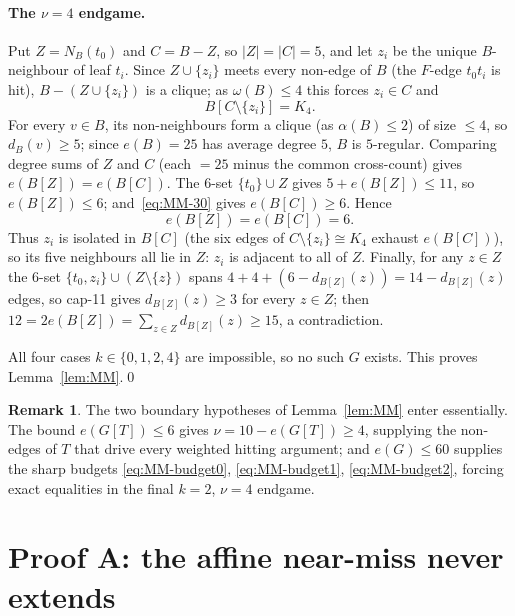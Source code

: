 \documentclass[11pt,reqno]{amsart}
\theoremstyle{definition}
\newtheorem{remark}[theorem]{Remark}
\theoremstyle{remark}
\newcommand{\abs}[1]{\left|#1\right|}
\newcommand{\capeleven}{\textsf{cap-11}}
\begin{document}
\paragraph{The $\nu=4$ endgame.}
Put $Z=N_B(t_0)$ and $C=B-Z$, so $\abs Z=\abs C=5$, and let $z_i$ be the unique
$B$-neighbour of leaf $t_i$. Since $Z\cup\{z_i\}$ meets every non-edge of $B$ (the
$F$-edge $t_0t_i$ is hit), $B-(Z\cup\{z_i\})$ is a clique; as $\omega(B)\le 4$ this
forces $z_i\in C$ and
\begin{equation}\label{eq:MM-30}
  B[C\setminus\{z_i\}]=K_4 .
\end{equation}
For every $v\in B$, its non-neighbours form a clique (as $\alpha(B)\le 2$) of size
$\le 4$, so $d_B(v)\ge 5$; since $e(B)=25$ has average degree $5$, $B$ is
$5$-regular. Comparing degree sums of $Z$ and $C$ (each $=25$ minus the common
cross-count) gives $e(B[Z])=e(B[C])$. The $6$-set $\{t_0\}\cup Z$ gives
$5+e(B[Z])\le 11$, so $e(B[Z])\le 6$; and~\eqref{eq:MM-30} gives $e(B[C])\ge 6$.
Hence
\[
  e(B[Z])=e(B[C])=6 .
\]
Thus $z_i$ is isolated in $B[C]$ (the six edges of $C\setminus\{z_i\}\cong K_4$
exhaust $e(B[C])$), so its five neighbours all lie in $Z$: $z_i$ is adjacent to all
of $Z$. Finally, for any $z\in Z$ the $6$-set $\{t_0,z_i\}\cup(Z\setminus\{z\})$
spans $4+4+(6-d_{B[Z]}(z))=14-d_{B[Z]}(z)$ edges, so \capeleven{} gives
$d_{B[Z]}(z)\ge 3$ for every $z\in Z$; then $12=2e(B[Z])=\sum_{z\in Z}d_{B[Z]}(z)\ge
15$, a contradiction.

\medskip
All four cases $k\in\{0,1,2,4\}$ are impossible, so no such $G$ exists. This proves
Lemma~\ref{lem:MM}.\qed

\begin{remark}
The two boundary hypotheses of Lemma~\ref{lem:MM} enter essentially. The bound
$e(G[T])\le 6$ gives $\nu=10-e(G[T])\ge 4$, supplying the non-edges of $T$ that
drive every weighted hitting argument; and $e(G)\le 60$ supplies the sharp budgets
\eqref{eq:MM-budget0}, \eqref{eq:MM-budget1}, \eqref{eq:MM-budget2}, forcing exact
equalities in the final $k=2$, $\nu=4$ endgame.
\end{remark}

\section{Proof A: the affine near-miss never extends}\label{sec:affine}
\end{document}
